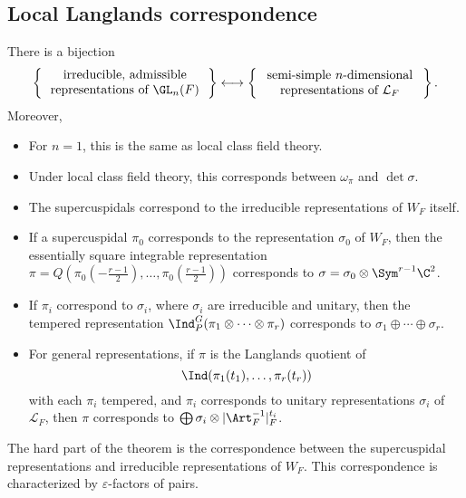 \documentclass[a4paper]{article}
\begin{document}
\subsection{Local Langlands correspondence}
\begin{thm}
  There is a bijection
  \[
    \left\{\parbox{4.6cm}{\centering irreducible, admissible representations of $\GL_n(F)$}\right\} \longleftrightarrow \left\{\parbox{4.6cm}{\centering semi-simple $n$-dimensional representations of $\mathcal{L}_F$}\right\}.
  \]
  Moreover,
  \begin{itemize}
    \item For $n = 1$, this is the same as local class field theory.
    \item Under local class field theory, this corresponds between $\omega_\pi$ and $\det \sigma$.
    \item The supercuspidals correspond to the irreducible representations of $W_F$ itself.
    \item If a supercuspidal $\pi_0$ corresponds to the representation $\sigma_0$ of $W_F$, then the essentially square integrable representation $\pi = Q(\pi_0(-\frac{r-1}{2}), \ldots, \pi_0(\frac{r - 1}{2}))$ corresponds to $\sigma = \sigma_0 \otimes \Sym^{r - 1} \C^2$.

    \item If $\pi_i$ correspond to $\sigma_i$, where $\sigma_i$ are irreducible and unitary, then the tempered representation $\Ind_P^G(\pi_1 \otimes \cdots \otimes \pi_r)$ corresponds to $\sigma_1 \oplus \cdots \oplus \sigma_r$.
%      
    \item For general representations, if $\pi$ is the Langlands quotient of
      \[
        \Ind(\pi_1(t_1), \ldots, \pi_r(t_r))
      \]
      with each $\pi_i$ tempered, and $\pi_i$ corresponds to unitary representations $\sigma_i$ of $\mathcal{L}_F$, then $\pi$ corresponds to $\bigoplus \sigma_i \otimes |\Art_F^{-1}|_F^{t_i}$.
  \end{itemize}
\end{thm}
The hard part of the theorem is the correspondence between the supercuspidal representations and irreducible representations of $W_F$. This correspondence is characterized by $\varepsilon$-factors of pairs.
\end{document}
